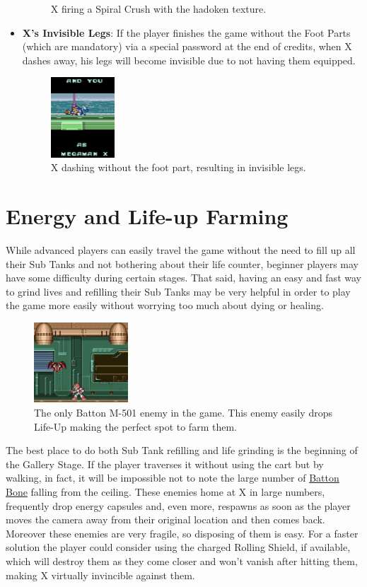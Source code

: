 \begin{itemize}
\begin{figure}[htp]
		\caption{X firing a Spiral Crush with the hadoken texture.}
	\end{figure}
	\item \textbf{X's Invisible Legs}: If the player finishes the game without the Foot Parts (which are mandatory) via a special password at the end of credits, when X dashes away, his legs will become invisible due to not having them equipped.
	\begin{figure}[htp]
		\centering
		\includegraphics[height=3cm]{figures/X1/Miscs/ending_legs.jpg}
		\caption{X dashing without the foot part, resulting in invisible legs.}
	\end{figure}
\end{itemize}
\section{Energy and Life-up Farming}
While advanced players can easily travel the game without the need to fill up all their Sub Tanks and not bothering about their life counter, beginner players may have some difficulty during certain stages. That said, having an easy and fast way to grind lives and refilling their Sub Tanks may be very helpful in order to play the game more easily without worrying too much about dying or healing.
\begin{figure}[htp]
	\centering
	\includegraphics[height=3cm]{figures/X1/Miscs/Farming_spot.jpg}
	\caption{The only Batton M-501 enemy in the game. This enemy easily drops Life-Up making the perfect spot to farm them.}
\end{figure}
The best place to do both Sub Tank refilling and life grinding is the beginning of the Gallery Stage. If the player traverses it without using the cart but by walking, in fact, it will be impossible not to note the large number of \hyperlink{enem:Batton_Bone}{Batton Bone}  falling from the ceiling. These enemies home at X in large numbers, frequently drop energy capsules and, even more, respawns as soon as the player moves the camera away from their original location and then comes back. Moreover these enemies are very fragile, so disposing of them is easy. For a faster solution the player could consider using the charged Rolling Shield, if available, which will destroy them as they come closer and won't vanish after hitting them, making X virtually invincible against them.

